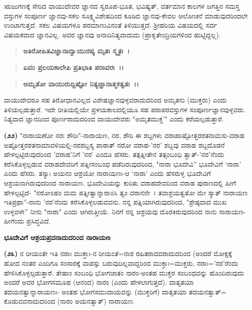 
ಋಜುಗಣಕ್ಕೆ ಸೇರಿದ ವಾಯುದೇವರ ಜ್ಞಾನದ ಸ್ವರೂಪ-ಭೂತ, ಭವಿಷ್ಯತ್, ವರ್ತಮಾನ ಕಾಲಗಳ ಜಗತ್ತಿನ ಸಮಸ್ತ ವಸ್ತುಗಳ ಸಂಪೂರ್ಣ ಜ್ಞಾನವು-ಸಕಲ ಸೂಕ್ಷ್ಮವಿಶೇಷದಿಂದ ಕೂಡಿದ ಜ್ಞಾನವು-ಕೇವಲ ಆಲೋಚನೆ ಮಾಡುವುದರಿಂದಲೇ ಉಂಟಾಗುತ್ತದೆ. ಸಕಲ ವಿಷಯಗಳೂ ಪರಮಾಣುವಿನಂತೆ ತಿಳಿಯುತ್ತದೆ. ಶ‍್ರೀಹರಿಯ ವಿಷಯದಲ್ಲಿ ಸರ್ವ ವಿಷಯಕವಾದ ಜ್ಞಾನವಿಲ್ಲ. ಅವರ ಜ್ಞಾನವು ಅನಾದಿನಿತ್ಯವಾದುದು (ಪ್ರಾಕೃತೇಂದ್ರಿಯಗಳಿಂದ ಹುಟ್ಟಿದ್ದಲ್ಲ).

\begin{verse}
\textbf{ಅತಿರೋಹಿತವಿಜ್ಞಾನಾದ್ವಾಯುರಪ್ಯ ಮೃತಃ ಸ್ಮೃತಃ~।}
\end{verse}


\begin{verse}
\textbf{ಏವಂ ಪ್ರಲಯಕಾಲೇಪಿ ಪ್ರತಿಭಾತಿ ಪರಾವರಃ~।।}
\end{verse}


\begin{verse}
\textbf{ಅಮೃತೋ ವಾಯುರುದ್ದಿಷ್ಟೋ ನಿತ್ಯಜ್ಞಾನಾತ್ಮಕತ್ವತಃ~।।}
\end{verse}


\noindent
ವಾಯುದೇವರೂ ಸಹ ತಿರೋಧಾನವಿಲ್ಲದ ವಿಶೇಷಜ್ಞಾನವುಳ್ಳವರಾದುದರಿಂದ ಅಮೃತನು (ಮುಕ್ತರು) ಎಂದು ತಿಳಿಯಲ್ಪಡುತ್ತಾರೆ. ಇದೇ ರೀತಿಯಲ್ಲಿಯೇ ಪ್ರಳಯಕಾಲದಲ್ಲಿಯೂ ಸಹ ಪರಾಪರವಸ್ತುಗಳ ಸಂಪೂರ್ಣಜ್ಞಾನವುಳ್ಳವರು. ನಿತ್ಯವಾದ ಜ್ಞಾನದಿಂದ ಪೂರ್ಣರಾದುದರಿಂದ ವಾಯುದೇವರು "ಅಮೃತಮುಕ್ತ'" ಎಂದು ಕರೆಯಲ್ಪಡುತ್ತಾರೆ.

\textbf{(೨೨)} "ನಾರಾಯಣೋ ನರಃ ಶೌರಿಃ"-ನಾರಾಯಣ, ನರ, ಶೌರಿ ಈ ಶಬ್ದಗಳು ವರಾಹಾಷ್ಟೋತ್ತರಶತನಾಮಸು-ವರಾಹ ಅಷ್ಟೋತ್ತರಶತನಾಮಾವಳಿಯಲ್ಲಿ-ನರಶಬ್ದಸ್ಯ ಪಾಠಾತ್ ನರೋ ವರಾಹ-'ನರ' ಶಬ್ದವು ವರಾಹ ಶಬ್ದದೊಡನೆ ಹೇಳಲ್ಪಟ್ಟಿರುವುದರಿಂದ 'ವರಾಹ'ನಿಗೆ 'ನರ' ಎಂದೂ ಹೆಸರು. ತತ್ಪತ್ನೀತೇನ ತತ್ಸಂಬಂಧಿ ತ್ವಾತ್-'ನರ'ನೆಂದು ಕರೆಸಿಕೊಳ್ಳಲ್ಪಡುವ ವರಾಹದೇವರಿಗೆ ಪತ್ನೀಸಂಬಂಧ ಪಡೆದಿರುವುದರಿಂದ, "ನಾರಾ ಭೂದೇವಿ'' ಭೂದೇವಿಗೆ `ನಾರಾ' ಎಂದು ಹೆಸರು. ತಸ್ಯಾಃ ಅಯನಂ ಆಶ್ರಯೋ ನಾರಾಯಣಃ-ಆ `ನಾರಾ' ಎಂದು ಹೆಸರುಳ್ಳ ಭೂದೇವಿಗೆ ಆಶ್ರಯನಾಗಿರುವುದರಿಂದ ನಾರಾಯಣ. ಭೂದೇವಿಯನ್ನು ಕುರಿತು ವರಾಹದೇವರಿಂದ ವರಾಹ ಪುರಾಣದಲ್ಲಿ ಹೀಗೆ ಹೇಳಲ್ಪಟ್ಟಿದೆ- "ನರೋಽಹಂ ಮಮ ಪತ್ನೀತ್ವಾನ್ನಾರಾಽಸಿ ತ್ವಂ ವರಾನನೇ~। ತವಾಶ್ರಯತ್ವತೋ ಮೇ ಸ್ಯಾತ್ ನಾರಾಯಣ ಇತಿ\break ಪ್ರಥಾ''-ನಾನು 'ನರ'ನೆಂದು ಕರೆಸಿಕೊಳ್ಳಲಡುವವನು. ನನ್ನ ಪತ್ನಿಯಾಗಿರುವುದರಿಂದ, "ಶ್ರೇಷ್ಠವಾದ ಮುಖ ಉಳ್ಳವಳೇ'' ನೀನು "ನಾರಾ" ಎಂದು ಆಗಿರುತ್ತೀಯೆ. ನಿನಗೆ ನನ್ನ ಆಶ್ರಯವು ದೊರಕಿರುವುದರಿಂದ ನಾನು ನಾರಾಯಣ- ಹೀಗೆಂದು ಪ್ರಸಿದ್ಧವಿದೆ.

\begin{center}
\textbf{ಭೂದೇವಿಗೆ ಆಶ್ರಯಪ್ರದನಾದುದರಿಂದ ನಾರಾಯಣ}
\end{center}

\textbf{(೨೩)} ನ ರೀಯಂತೇ ಇತಿ ನರಾಃ ಮುಕ್ತಾಃ-ನ ರೀಯಂತೆ=ನಾಶ ರಹಿತರಾದವರಾದುದರಿಂದ (ಅಂದರೆ ಮೋಕ್ಷಕ್ಕೆ ಹೋದ ನಂತರ ಎಂದಿಗೂ ಸಂಸಾರಕ್ಕೆ ವಾಪಸ್ಸು ಬರುವುದಿಲ್ಲವಾದ್ದರಿಂದ ಮುಕ್ತಾಃ=ಮುಕ್ತರು, ನರಾಃ='ನರ'ರೆಂದು ಹೇಳಿಸಿಕೊಳ್ಳಲ್ಪಡುತ್ತಾರೆ. ತೇಷಾಂ ಸಂಬಂಧಿ ಭೋಗಜಾತಂ ನಾರಂ-ಅಂತಹ ಮುಕ್ತರ ಸಂಬಂಧವನ್ನು ಹೊಂದಿರುವುದು ಅಂದರೆ ಅವರ ಭೋಗಸಮೂಹ (ಆನಂದ) ನಾರಂ (ಎಂದು ಹೇಳಲಾಗುತ್ತದೆ). ದಾತೃತಯಾ ತದಯನತ್ವಾನ್ನಾರಾಯಣಃ- ಅಂತಹ ಭೋಗಸಮುದಾಯವನ್ನು (ಮುಕ್ತರಿಗೆ) ದಾತೃತಯಾ ತದಯನತ್ವಾತ್= ಕೊಡುವವನಾದುದರಿಂದ (ನಾರಂ ಅಯನತ್ವಾತ್) ನಾರಾಯಣ.

